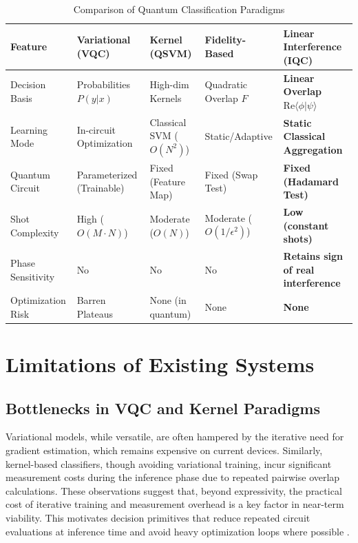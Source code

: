 \documentclass[conference]{IEEEtran}
\begin{document}
\begin{table}[t]
\centering
\caption{Comparison of Quantum Classification Paradigms}
\label{tab:comparison}
\begin{tabular}{@{}lllll@{}}
\toprule
Feature & Variational (VQC) & Kernel (QSVM) & Fidelity-Based & \textbf{Linear Interference (IQC)} \\ \midrule
Decision Basis & Probabilities $P(y|x)$ & High-dim Kernels & Quadratic Overlap $F$ & \textbf{Linear Overlap $\mathrm{Re}\langle \phi|\psi \rangle$} \\
Learning Mode & In-circuit Optimization & Classical SVM ($O(N^2)$) & Static/Adaptive & \textbf{Static Classical Aggregation} \\
Quantum Circuit & Parameterized (Trainable) & Fixed (Feature Map) & Fixed (Swap Test) & \textbf{Fixed (Hadamard Test)} \\
Shot Complexity & High ($O(M \cdot N)$) & Moderate ($O(N)$) & Moderate ($O(1/\epsilon^2)$) & \textbf{Low (constant shots)} \\
Phase Sensitivity & No & No & No & \textbf{Retains sign of real interference} \\
Optimization Risk & Barren Plateaus & None (in quantum) & None & \textbf{None} \\ \bottomrule
\end{tabular}
\end{table}

\section{Limitations of Existing Systems}

\subsection{Bottlenecks in VQC and Kernel Paradigms}
Variational models, while versatile, are often hampered by the iterative need for gradient estimation, which remains expensive on current devices. Similarly, kernel-based classifiers, though avoiding variational training, incur significant measurement costs during the inference phase due to repeated pairwise overlap calculations.
These observations suggest that, beyond expressivity, the practical cost of iterative training and measurement overhead is a key factor in near-term viability. This motivates decision primitives that reduce repeated circuit evaluations at inference time and avoid heavy optimization loops where possible \cite{benedetti2019parameterized,mcclean2018barren}.
\end{document}
